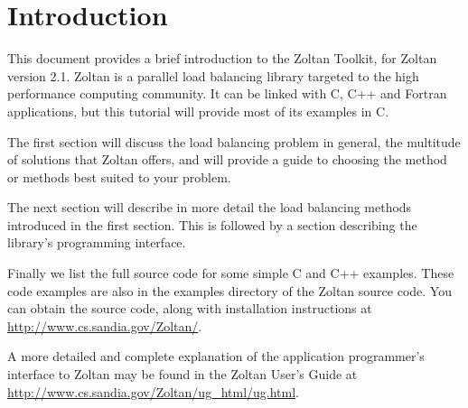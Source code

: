 %
% 
%
\chapter{Introduction}

This document provides a brief introduction to the Zoltan Toolkit,
for Zoltan version 2.1.  Zoltan is a parallel load balancing library
targeted to the high performance computing community.  It can be
linked with C, C++ and Fortran applications, but this tutorial
will provide most of its examples in C.

The first section will discuss the load balancing problem in general,
the multitude of solutions that Zoltan offers, and will provide a guide
to choosing the method or methods best suited to your problem.

The next section will describe in more detail the load balancing
methods introduced in the first section.  This is followed
by a section describing the library's programming interface.

Finally we list the full source code for some simple C and C++
examples.   These code examples are also in the examples directory
of the Zoltan source code.  You can obtain the source code,
along with installation instructions at
\url{http://www.cs.sandia.gov/Zoltan/}.

A more detailed and complete explanation of the application
programmer's interface to Zoltan may be found 
in the Zoltan User's Guide at
\url{http://www.cs.sandia.gov/Zoltan/ug_html/ug.html}.

